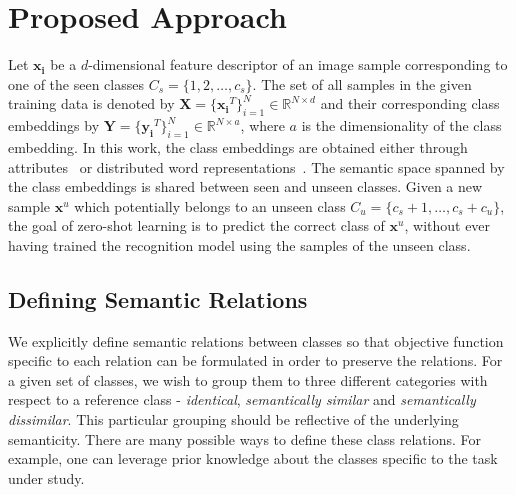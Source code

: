 \documentclass[10pt,twocolumn,letterpaper]{article}
\begin{document}
\section{Proposed Approach}
\label{proposed}
Let $\mathbf{x_i}$ be a $d$-dimensional feature descriptor of an image sample corresponding to one of the seen classes $C_s =\{1,2,\dots,c_s\}$. The set of all samples in the given training data is denoted by $\mathbf{X} = \{\mathbf{x_i}^T\}_{i=1}^{N}$$\in \mathbb{R}^{N\times d}$ and their corresponding class embeddings by $\mathbf{Y} =\{\mathbf{y_i}^T\}_{i=1}^{N}$$\in \mathbb{R}^{N\times a}$, where $a$ is the dimensionality of the class embedding. In this work, the class embeddings are obtained either through attributes~\cite{farhadi2009describing,lampert2009learning,wah2011caltech,xiao2010sun} or distributed word representations~\cite{mikolov2013distributed}. %
The semantic space spanned by the class embeddings is shared between seen and unseen classes.  
Given a new sample $\mathbf{x}^u$ which potentially belongs to an unseen class $C_u=\{c_s+1,\dots,c_s+c_u\}$,  the goal of zero-shot learning is to predict the correct class of $\mathbf{x}^u$, without ever having trained the recognition model using the samples of the unseen class. %
\subsection{Defining Semantic Relations}
\label{relations}
We explicitly define semantic relations between classes so that objective function specific to each relation can be formulated in order to preserve the relations. For a given set of classes, we wish to group them to three different categories with respect to a reference class - \textit{identical}, \textit{semantically similar} and \textit{semantically dissimilar}. This particular grouping should be reflective of the underlying semanticity. There are many possible ways to define these class relations. For example, one can leverage prior knowledge about the classes specific to the task under study. 
\end{document}
